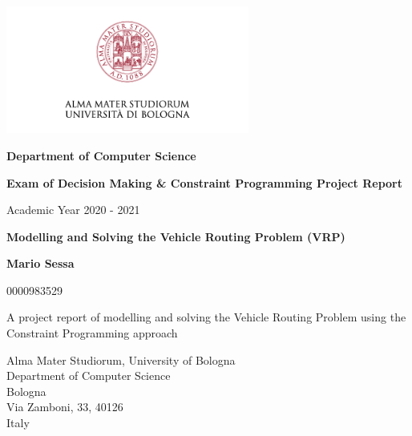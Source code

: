 \begin{titlepage}
    \begin{center}
        \vspace*{0.1cm}
        
          
        \includegraphics[width=0.6\textwidth]{images/logo-unibo.png}
        
        \large
         \textbf{Department of Computer Science}
         \vspace{0.5cm}
         
         \textbf{Exam of Decision Making \& Constraint Programming\newline   
         Project Report}
         \vspace{1cm}
         
         Academic Year 2020 - 2021
         
         
         \vspace{2cm}
        
        
        \LARGE
        \textbf{Modelling and Solving the Vehicle Routing Problem (VRP)}
        
        
        \vspace{1.5cm}
        \large
        \textbf{Mario Sessa}
        
        0000983529
        
        \vspace{1.5cm}
        A project report of modelling and solving the Vehicle Routing Problem using the Constraint Programming approach

        
        \vspace{0.8cm}
      \begin{flushright}
        \footnotesize
        Alma Mater Studiorum, University of Bologna \\
        Department of Computer Science\\
        Bologna\\
        Via Zamboni, 33, 40126\\
        Italy \\
        \end{flushright}
        
    \end{center}
\end{titlepage}